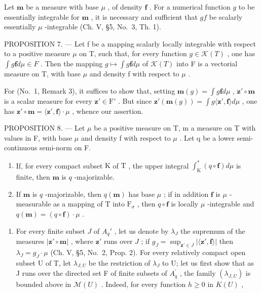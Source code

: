 Let \(\mathbf{m}\) be a measure with base \(\mu\) , of density \(\mathbf{f}\) . For a numerical function \(g\) to be essentially integrable for \(\mathbf{m}\) , it is necessary and sufficient that \(gf\) be scalarly essentially \(\mu\) -integrable (Ch. V, §5, No.~3, Th. 1).

PROPOSITION 7. --- Let f be a mapping scalarly locally integrable with respect to a positive measure \(\mu\) on T, such that, for every function \(g \in \mathcal{K}(T)\) , one has \(\int g\mathbf{f} d\mu \in F\) . Then the mapping \(g \mapsto \int g\mathbf{f} d\mu\) of \(\mathcal{K}(T)\) into F is a vectorial measure on T, with base \(\mu\) and density f with respect to \(\mu\) .

For (No.~1, Remark 3), it suffices to show that, setting \(\mathbf{m}(g) = \int g\mathbf{f}d\mu\) , \(\mathbf{z}' \circ \mathbf{m}\) is a scalar measure for every \(\mathbf{z}' \in \mathrm{F}'\) . But since \(\mathbf{z}'(\mathbf{m}(g)) = \int g\langle \mathbf{z}', \mathbf{f} \rangle d\mu\) , one has \(\mathbf{z}' \circ \mathbf{m} = \langle \mathbf{z}', \mathbf{f} \rangle \cdot \mu\) , whence our assertion.

PROPOSITION 8. --- Let \(\mu\) be a positive measure on T, m a measure on T with values in F, with base \(\mu\) and density f with respect to \(\mu\) . Let q be a lower semi-continuous semi-norm on F.

\begin{enumerate}
\def\labelenumi{\alph{enumi})}
\item
  If, for every compact subset \(\mathrm{K}\) of \(\mathrm{T}\) , the upper integral \(\int_{\mathrm{K}}^{*}(q \circ \mathbf{f}) d\mu\) is finite, then \(\mathbf{m}\) is \(q\) -majorizable.
\item
  If \(\mathbf{m}\) is \(q\) -majorizable, then \(q(\mathbf{m})\) has base \(\mu\) ; if in addition \(\mathbf{f}\) is \(\mu\) -measurable as a mapping of \(\mathrm{T}\) into \(\mathrm{F}_{\sigma}\) , then \(q \circ \mathbf{f}\) is locally \(\mu\) -integrable and \(q(\mathbf{m}) = (q \circ \mathbf{f}) \cdot \mu\) .
\end{enumerate}

\begin{enumerate}
\def\labelenumi{\alph{enumi})}
\tightlist
\item
  For every finite subset \(J\) of \(A_q'\) , let us denote by \(\lambda_J\) the supremum of the measures \(|\mathbf{z}' \circ \mathbf{m}|\) , where \(\mathbf{z}'\) runs over \(J\) ; if \(g_J = \sup_{\mathbf{z}' \in J} |\langle \mathbf{z}', \mathbf{f} \rangle|\) then \(\lambda_{J}=g_{J}\cdot\mu\) (Ch. V, §5, No.~2, Prop. 2). For every relatively compact open subset U of T, let \(\lambda_{J,U}\) be the restriction of \(\lambda_{J}\) to U; let us first show that as J runs over the directed set F of finite subsets of \(A_{q}^{\prime}\) , the family \((\lambda_{J,U})\) is bounded above in \(\mathcal{M}(U)\) . Indeed, for every function \(h\geqslant0\) in \(K(U)\) ,
\end{enumerate}

